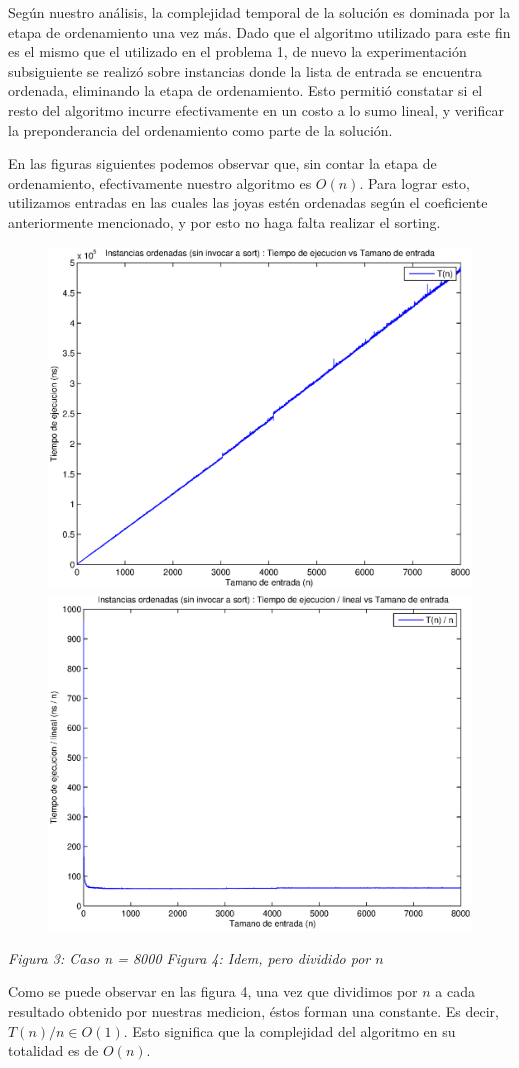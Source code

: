 Según nuestro análisis, la complejidad temporal de la solución es dominada por la etapa de ordenamiento una vez más. Dado que el algoritmo utilizado para este fin es el mismo que el utilizado en el problema 1, de nuevo la experimentación subsiguiente se realizó sobre instancias donde la lista de entrada se encuentra ordenada, eliminando la etapa de ordenamiento. Esto permitió constatar si el resto del algoritmo incurre efectivamente en un costo a lo sumo lineal, y verificar la preponderancia del ordenamiento como parte de la solución.

En las figuras siguientes podemos observar que, sin contar la etapa de ordenamiento, efectivamente nuestro algoritmo es $O(n)$. Para lograr esto, utilizamos entradas en las cuales las joyas estén ordenadas según el coeficiente anteriormente mencionado, y por esto no haga falta realizar el sorting.

\begin{figure}[H]
    \includegraphics[width=0.5\linewidth]{problema2/graficos/problema2_ordenada_8000.eps}
    \includegraphics[width=0.5\linewidth]{problema2/graficos/problema2_ordenada_8000_div_n.eps}
\end{figure}
\emph{\hspace{2,5cm}Figura 3: Caso n = 8000 \hspace{3cm}Figura 4: Idem, pero dividido por $n$}

Como se puede observar en las figura 4, una vez que dividimos por $n$ a cada resultado obtenido por nuestras medicion, éstos forman una constante. Es decir, $T(n)/n \in O(1)$. Esto significa que la complejidad del algoritmo en su totalidad es de $O(n)$.

